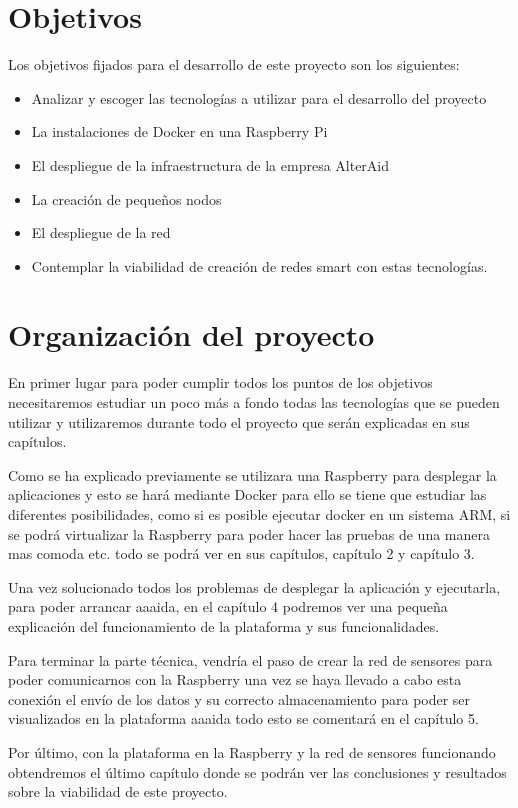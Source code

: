 \section{Objetivos}

Los objetivos fijados para el desarrollo de este proyecto son los siguientes:

\begin{itemize}
\item Analizar y escoger las tecnologías a utilizar para el desarrollo del proyecto
\item La instalaciones de Docker en una Raspberry Pi
\item El despliegue de la infraestructura de la empresa AlterAid
\item La creación de pequeños nodos
\item El despliegue de la red
\item Contemplar la viabilidad de creación de redes smart con estas tecnologías. 
\end{itemize}

\section{Organización del proyecto}

En primer lugar para poder cumplir todos los puntos de los objetivos necesitaremos estudiar un poco más a fondo todas las tecnologías que se pueden utilizar y utilizaremos durante todo el proyecto que serán explicadas en sus capítulos. 

Como se ha explicado previamente se utilizara una Raspberry para desplegar la aplicaciones y esto se hará mediante Docker para ello se tiene que estudiar las diferentes posibilidades, como si es posible ejecutar docker en un sistema ARM, si se podrá virtualizar la Raspberry para poder hacer las pruebas de una manera mas comoda etc. todo se podrá ver en sus capítulos, capítulo 2 y capítulo 3. 

Una vez solucionado todos los problemas de desplegar la aplicación y ejecutarla, para poder arrancar aaaida, en el capítulo 4 podremos ver una pequeña explicación del funcionamiento de la plataforma y sus funcionalidades. 

Para terminar la parte técnica, vendría el paso de crear la red de sensores para poder comunicarnos con la Raspberry una vez se haya llevado a cabo esta conexión el envío de los datos y su correcto almacenamiento para poder ser visualizados en la plataforma aaaida todo esto se comentará en el capítulo 5. 

Por último, con la plataforma en la Raspberry y la red de sensores funcionando obtendremos el último capítulo donde se podrán ver las conclusiones y resultados sobre la viabilidad de este proyecto. 

